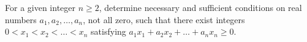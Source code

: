 For a given integer $n\geq2$, determine necessary and sufficient conditions on real numbers $a_1,a_2,\ldots,a_n$, not all zero, such that there exist integers $0<x_1<x_2<\ldots<x_n$ satisfying $a_1x_1+a_2x_2+\ldots+a_nx_n\geq0$.